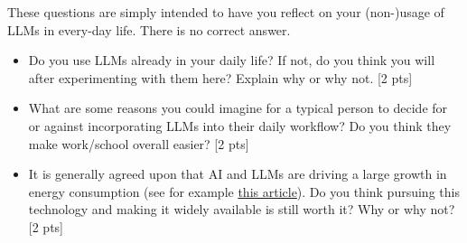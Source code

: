 \documentclass[11pt]{article}
\begin{document}
\vspace{2em}
 These questions are simply intended to have you reflect on your (non-)usage of LLMs in every-day life. There is no correct answer.
\begin{itemize}
  \item Do you use LLMs already in your daily life? If not, do you think you will after experimenting with them here? Explain why or why not. [2 pts]
  \item What are some reasons you could imagine for a typical person to decide for or against incorporating LLMs into their daily workflow? Do you think they make work/school overall easier? [2 pts]
  \item It is generally agreed upon that AI and LLMs are driving a large growth in energy consumption (see for example \href{https://www.scientificamerican.com/article/the-ai-boom-could-use-a-shocking-amount-of-electricity/}{this article}). Do you think pursuing this technology and making it widely available is still worth it? Why or why not? [2 pts]
\end{itemize}
\end{document}
